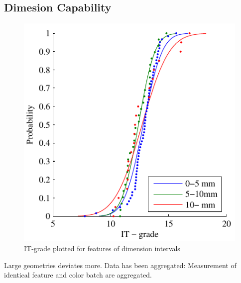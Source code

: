 \documentclass[aip,amsmath, reprint, author-year,nobalancelastpage]{revtex4-1}
\begin{document}
\subsection{Dimesion Capability}
\begin{figure}[H]
\includegraphics{ITG_DimSort.pdf}
\caption{\label{fig:ITG_DimSort} IT-grade plotted for features of dimension intervals  }
\end{figure}

Large geometries deviates more. 
Data has been aggregated: Measurement of identical feature and color batch are aggregated.
\end{document}
